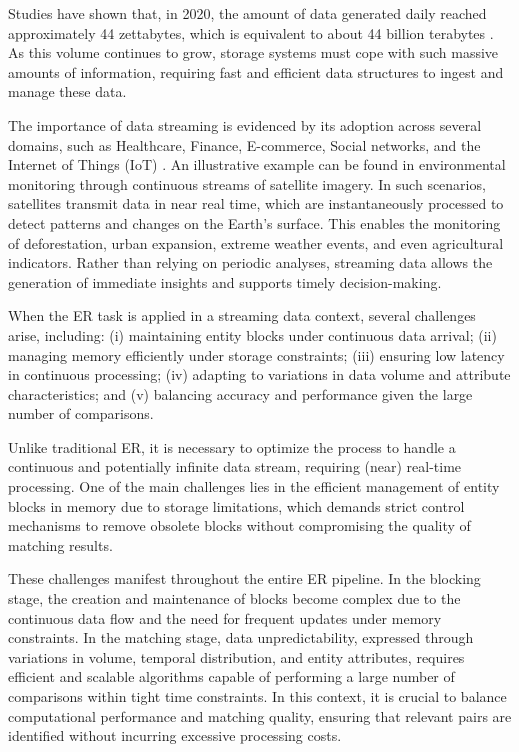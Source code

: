 \documentclass{ieeeaccess}
\begin{document}
Studies have shown that, in 2020, the amount of data generated daily reached approximately 44 zettabytes, which is equivalent to about 44 billion terabytes \cite{Berisha2022}. As this volume continues to grow, storage systems must cope with such massive amounts of information, requiring fast and efficient data structures to ingest and manage these data.

The importance of data streaming is evidenced by its adoption across several domains, such as Healthcare, Finance, E-commerce, Social networks, and the Internet of Things (IoT) \cite{DHARAVATH201593, gentile2017entity, 10.1145/3448016.3457238, doi:10.1504/IJWGS.2017.085167, Sergey2012JointLU}. An illustrative example can be found in environmental monitoring through continuous streams of satellite imagery. In such scenarios, satellites transmit data in near real time, which are instantaneously processed to detect patterns and changes on the Earth’s surface. This enables the monitoring of deforestation, urban expansion, extreme weather events, and even agricultural indicators. Rather than relying on periodic analyses, streaming data allows the generation of immediate insights and supports timely decision-making.

When the ER task is applied in a streaming data context, several challenges arise, including: (i) maintaining entity blocks under continuous data arrival; (ii) managing memory efficiently under storage constraints; (iii) ensuring low latency in continuous processing;  (iv) adapting to variations in data volume and attribute characteristics; and (v) balancing accuracy and performance given the large number of comparisons.

Unlike traditional ER, it is necessary to optimize the process to handle a continuous and potentially infinite data stream, requiring (near) real-time processing. One of the main challenges lies in the efficient management of entity blocks in memory due to storage limitations, which demands strict control mechanisms to remove obsolete blocks without compromising the quality of matching results.

These challenges manifest throughout the entire ER pipeline. In the blocking stage, the creation and maintenance of blocks become complex due to the continuous data flow and the need for frequent updates under memory constraints. In the matching stage, data unpredictability, expressed through variations in volume, temporal distribution, and entity attributes, requires efficient and scalable algorithms capable of performing a large number of comparisons within tight time constraints. In this context, it is crucial to balance computational performance and matching quality, ensuring that relevant pairs are identified without incurring excessive processing costs.
\end{document}
